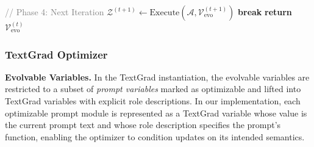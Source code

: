 \begin{algorithm}[t]
\begin{algorithmic}[1]
      \vspace{0.2em}
      \STATE \textcolor{gray}{// Phase 4: Next Iteration}
      \STATE $\mathcal{Z}^{(t+1)} \leftarrow \text{Execute}(\mathcal{A}, \mathcal{V}_{\text{evo}}^{(t+1)})$ 
          \STATE \textbf{break}
      \ENDIF
  \ENDFOR
  \STATE \textbf{return} $\mathcal{V}_{\text{evo}}^{(t)}$
  \end{algorithmic}
  \end{algorithm}

\subsubsection{TextGrad Optimizer}

\textbf{Evolvable Variables.}
In the TextGrad instantiation, the evolvable variables are restricted to a subset of \emph{prompt variables} marked as optimizable and lifted into TextGrad variables with explicit role descriptions. In our implementation, each optimizable prompt module is represented as a TextGrad variable whose value is the current prompt text and whose role description specifies the prompt's function, enabling the optimizer to condition updates on its intended semantics.

